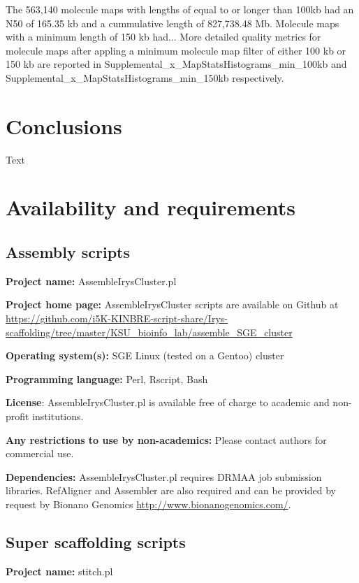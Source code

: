 \documentclass{bmcart}
\begin{document}
The 563,140 molecule maps with lengths of equal to or longer than 100kb had an N50 of 165.35 kb and a cummulative length of 827,738.48 Mb. Molecule maps with a minimum length of 150 kb had... More detailed quality metrics for molecule maps after appling a minimum molecule map filter of either 100 kb or 150 kb are reported in Supplemental\_x\_MapStatsHistograms\_min\_100kb and Supplemental\_x\_MapStatsHistograms\_min\_150kb respectively.




\section*{Conclusions}
Text


\section*{Availability and requirements}

\subsection*{\textbf{Assembly scripts}}

\textbf{Project name:} AssembleIrysCluster.pl

\textbf{Project home page:} AssembleIrysCluster scripts are available on Github at \url{https://github.com/i5K-KINBRE-script-share/Irys-scaffolding/tree/master/KSU\_bioinfo\_lab/assemble\_SGE\_cluster}

\textbf{Operating system(s):} SGE Linux (tested on a Gentoo) cluster

\textbf{Programming language:} Perl, Rscript, Bash

\textbf{License}: AssembleIrysCluster.pl is available free of charge to academic and non-profit institutions.

\textbf{Any restrictions to use by non-academics:} Please contact authors for commercial use.

\textbf{Dependencies:} AssembleIrysCluster.pl requires DRMAA job submission libraries. RefAligner and Assembler are also required and can be provided by request by Bionano Genomics \url{http://www.bionanogenomics.com/}.

\subsection*{\textbf{Super scaffolding scripts}}

\textbf{Project name:} stitch.pl
\end{document}
